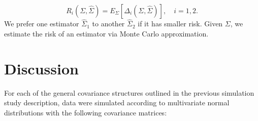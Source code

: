 \documentclass[12pt]{article}
\theoremstyle{definition}
\begin{document}
\begin{equation*}
R_i \left(\Sigma,\hat{\Sigma}\right) = E_\Sigma\left[\Delta_i\left(\Sigma,\hat{\Sigma}\right)\right], \quad i = 1,2.
\end{equation*}
\noindent
We prefer one estimator $\hat{\Sigma}_1$ to another $\hat{\Sigma}_2$ if it has smaller risk.  Given $\Sigma$, we estimate the risk of an estimator via Monte Carlo approximation. 

\section{Discussion}

For each of the general covariance structures outlined in the previous simulation study description, data were simulated according to multivariate normal distributions with the following covariance matrices: 
\end{document}
